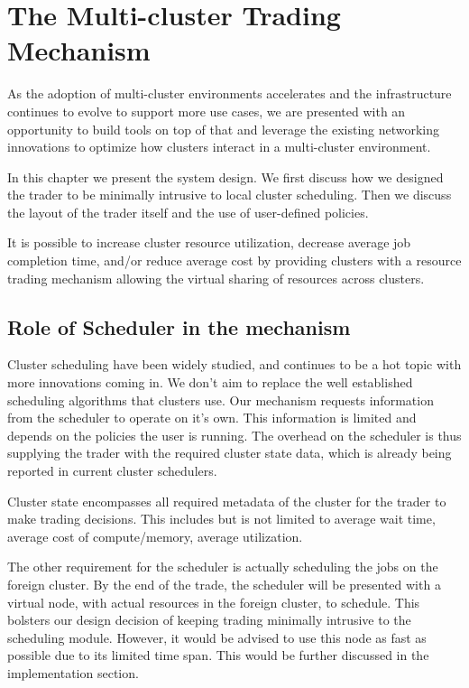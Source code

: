 
\chapter{The Multi-cluster Trading Mechanism}

As the adoption of multi-cluster environments accelerates and the
infrastructure continues to evolve to support more use cases, we are presented
with an opportunity to build tools on top of that and leverage the existing
networking innovations to optimize how clusters interact in a multi-cluster
environment. 

In this chapter we present the system design. We first discuss how we designed
the trader to be minimally intrusive to local cluster scheduling. Then we
discuss the layout of the trader itself and the use of user-defined policies. 

It is possible to increase cluster resource utilization, decrease average job
completion time, and/or reduce average cost by providing clusters with a
resource trading mechanism allowing the virtual sharing of resources across
clusters. 


\section{Role of Scheduler in the mechanism}

Cluster scheduling have been widely studied, and continues to be a hot topic
with more innovations coming in. We don't aim to replace the well established
scheduling algorithms that clusters use. Our mechanism requests information
from the scheduler to operate on it's own. This information is limited and
depends on the policies the user is running. The overhead on the scheduler is
thus supplying the trader with the required cluster state data, which is
already being reported in current cluster schedulers. 

Cluster state encompasses all required metadata of the cluster for the trader
to make trading decisions. This includes but is not limited to average wait
time, average cost of compute/memory, average utilization. 

The other requirement for the scheduler is actually scheduling the jobs on the
foreign cluster. By the end of the trade, the scheduler will be presented with
a virtual node, with actual resources in the foreign cluster, to schedule. This
bolsters our design decision of keeping trading minimally intrusive to the
scheduling module. However, it would be advised to use this node as fast as
possible due to its limited time span. This would be further discussed in the
implementation section.  

